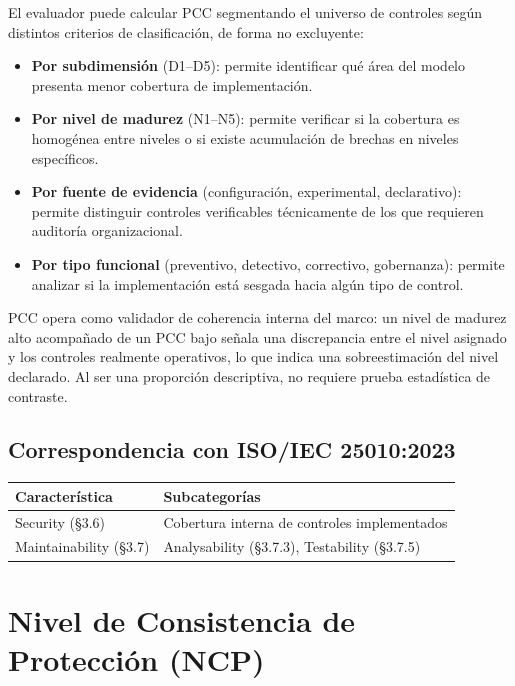 El evaluador puede calcular PCC segmentando el universo de controles
según distintos criterios de clasificación, de forma no excluyente:

\begin{itemize}
  \item \textbf{Por subdimensión} (D1--D5): permite identificar qué
  área del modelo presenta menor cobertura de implementación.
  \item \textbf{Por nivel de madurez} (N1--N5): permite verificar si
  la cobertura es homogénea entre niveles o si existe acumulación de
  brechas en niveles específicos.
  \item \textbf{Por fuente de evidencia} (configuración, experimental,
  declarativo): permite distinguir controles verificables técnicamente
  de los que requieren auditoría organizacional.
  \item \textbf{Por tipo funcional} (preventivo, detectivo, correctivo,
  gobernanza): permite analizar si la implementación está sesgada hacia
  algún tipo de control.
\end{itemize}

PCC opera como validador de coherencia interna del marco: un nivel de
madurez alto acompañado de un PCC bajo señala una discrepancia entre
el nivel asignado y los controles realmente operativos, lo que indica
una sobreestimación del nivel declarado. Al ser una proporción
descriptiva, no requiere prueba estadística de contraste.

\subsection{Correspondencia con ISO/IEC 25010:2023}

\begin{table}[H]
    \centering
    \renewcommand{\arraystretch}{1.4}
    \begin{tabular}{
      >{\raggedright\arraybackslash}p{4cm}
      >{\raggedright\arraybackslash}p{7.5cm}
    }
    \toprule
    \textbf{Característica} & \textbf{Subcategorías} \\
    \midrule
    Security (\S3.6) &
      Cobertura interna de controles implementados \\
    \addlinespace
    Maintainability (\S3.7) &
      Analysability (\S3.7.3), Testability (\S3.7.5) \\
    \bottomrule
    \end{tabular}
\end{table}

\section{Nivel de Consistencia de Protección (NCP)}
\label{sec:ncp}

